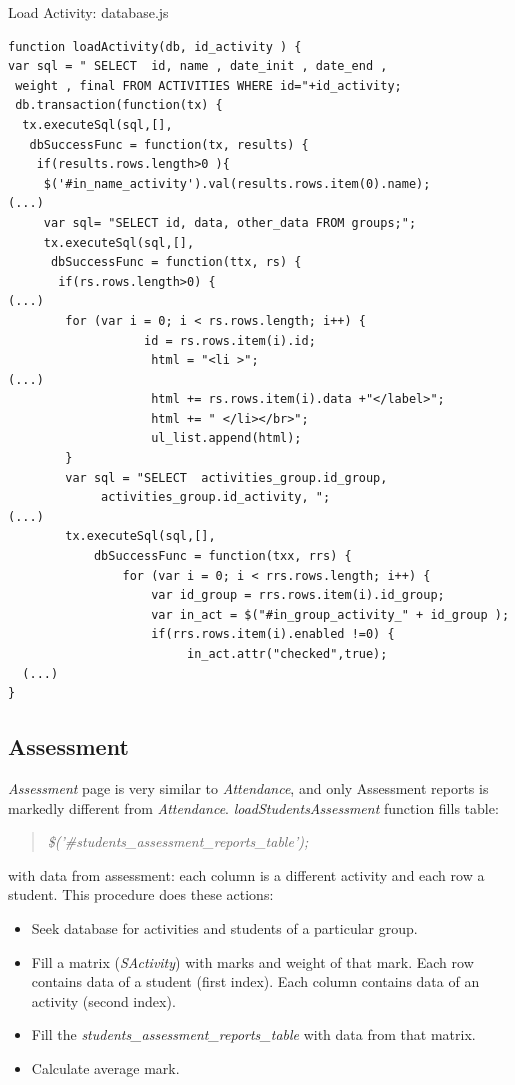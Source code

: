\begin{bclogo}[couleur=blue!30,arrondi=0.1,ombre=true ] 
{Load Activity: database.js \label{load_activity}}
\begin{verbatim}
function loadActivity(db, id_activity ) {
var sql = " SELECT  id, name , date_init , date_end , 
 weight , final FROM ACTIVITIES WHERE id="+id_activity;
 db.transaction(function(tx) {
  tx.executeSql(sql,[],
   dbSuccessFunc = function(tx, results) {
    if(results.rows.length>0 ){
     $('#in_name_activity').val(results.rows.item(0).name);
(...)
     var sql= "SELECT id, data, other_data FROM groups;";
     tx.executeSql(sql,[],
      dbSuccessFunc = function(ttx, rs) {
       if(rs.rows.length>0) {
(...)
        for (var i = 0; i < rs.rows.length; i++) {
                   id = rs.rows.item(i).id;
                    html = "<li >";
(...)
                    html += rs.rows.item(i).data +"</label>";
                    html += " </li></br>";
                    ul_list.append(html);
        }
        var sql = "SELECT  activities_group.id_group,
             activities_group.id_activity, ";
(...)
        tx.executeSql(sql,[],
            dbSuccessFunc = function(txx, rrs) {
                for (var i = 0; i < rrs.rows.length; i++) { 
                    var id_group = rrs.rows.item(i).id_group;
                    var in_act = $("#in_group_activity_" + id_group );
                    if(rrs.rows.item(i).enabled !=0) {
                         in_act.attr("checked",true); 
  (...)
}
\end{verbatim}
\end{bclogo}


\newpage
\subsection{Assessment}

 \textit{Assessment} page is very similar to \textit{Attendance}, and only Assessment reports is  markedly
	different from \textit{Attendance}. \textit{loadStudentsAssessment} function fills table:
	\begin{quote}
\textit{\$('\#students\_assessment\_reports\_table');} 	    
	\end{quote}

with data from assessment: each column is a different activity and each row a student. This procedure does these actions:

\begin{itemize}
    \item Seek database for activities and students of a particular group.
    \item Fill a matrix (\textit{SActivity}) with marks and weight of that mark.
    \subitem Each row contains data of a student (first index).
    \subitem Each column contains data of an activity (second index).
    \item Fill the \textit{students\_assessment\_reports\_table} with data from that matrix.
    \item Calculate average mark.
\end{itemize}
\newpage
    
